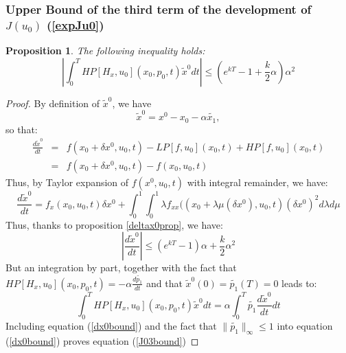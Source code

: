 \documentclass[a4paper,10pt]{article}
\newtheorem{proposition}{Proposition}
\begin{document}
\subsubsection{Upper Bound of the third term of the development of 
$J(u_{0})$ (\ref{expJu0})}
\begin{proposition}
    The following inequality holds:
\begin{equation}
        \left|\int_{0}^{T} HP[H_{x},u_{0}](x_{0},p_{0},t) \tilde{x}^{0} dt \right|
        \leq \left(e^{kT}-1+\frac{k}{2}\alpha\right)\alpha^{2}
    \label{J03bound}
\end{equation}
\end{proposition}
\begin{proof}
    By definition of $\tilde{x}^{0}$, we have
    \[
        \tilde{x}^{0} = x^{0} - x_{0} - \alpha \tilde{x_{1}},
    \]
    so that:
    \begin{eqnarray*}
        \frac{d \tilde{x}^{0}}{dt} & = & f(x_{0}+\delta x^{0},u_{0},t)
	 - LP[f,u_{0}](x_{0},t) + HP[f,u_{0}](x_{0},t)\\
          & = & f(x_{0}+\delta x^{0},u_{0},t) - f(x_{0},u_{0},t)
    \end{eqnarray*}
Thus, by Taylor expansion of 
$f(x^{0},u_{0},t)$ with integral remainder, we have:
\[
            \frac{d \tilde{x}^{0}}{dt} = f_{x}(x_{0},u_{0},t) \delta 
	    x^{0}  
               + \int_{0}^{1} \int_{0}^{1} 
               \lambda f_{xx}((x_{0}+ \lambda \mu (\delta 
               x^{0}),u_{0},t)(\delta x^{0})^{2} d \lambda d \mu
\]
     Thus, thanks to proposition \ref{deltax0prop}, we have:     
     \begin{equation}
             \left| \frac{d \tilde{x}^{0}}{dt}\right|
              \leq (e^{kT}-1)\alpha +\frac{k}{2}\alpha^{2}
         \label{dx0bound}
     \end{equation}
     But an integration by part, together with the fact that $ 
     HP[H_{x},u_{0}](x_{0},p_{0},t) =-\alpha \frac{d \tilde{p_{1}}}{dt}$ 
     and that $\tilde{x}^{0}(0)=\tilde{p_{1}}(T)=0$ leads to:
     \begin{equation}
         \int_{0}^{T} HP[H_{x},u_{0}](x_{0},p_{0},t) \tilde{x}^{0} dt 
	 = \alpha \int_{0}^{T}  \tilde{p_{1}} 
	 \frac{d\tilde{x}^{0}}{dt}dt
         \label{intbypart0}
     \end{equation}
     Including equation (\ref{dx0bound}) and the fact that 
     $\|\tilde{p_{1}}\|_{\infty} \leq 1$ into equation 
     (\ref{dx0bound}) proves equation (\ref{J03bound})
 \end{proof}
\end{document}
